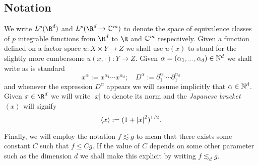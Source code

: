 \documentclass[12pt]{article}
\newcommand{\br}[1]{\left\langle#1\right\rangle}
\begin{document}
\subsection*{Notation}
We  write $L^p(\R^d)$ and $L^p(\R^d\to\C^m)$ to denote the space of equivalence classes of $p$ integrable functions from $\R^d$ to $\R$ and $\mathbb{C}^m$ respectively.\bigbreak
Given a function defined on a factor space $u:X\times Y\rightarrow Z$ we shall use $u(x)$ to stand for the slightly more cumbersome $u(x,\cdot ):Y\rightarrow Z$.
Given $\alpha=(\alpha_1,...,\alpha_d)\in\mathbb{N}^d$ we shall write as is standard \[x^\alpha:=x^{\alpha_1}\cdots  x^{\alpha_d};\quad D^\alpha:=\partial_1^{\alpha_1}\cdots\partial_1^{\alpha_d}\]
and whenever the expression $D^\alpha$ appears we will assume implicitly that $\alpha\in\mathbb{N}^d$.
Given  $x\in\R^d$ we will write $\abs{x}$ to denote its norm and the \emph{Japanese bracket} $\br{x}$ will signify
\[\br{x}:=(1+\abs{x}^2)^{1/2}.\]

Finally, we will employ the notation $f\lesssim g$ to mean that there exists some constant $C$ such that $f\leq Cg$. If the value of $C$ depends on some other parameter such as the dimension $d$ we shall make this explicit by writing $f\lesssim_d g$.\bigbreak
\end{document}
